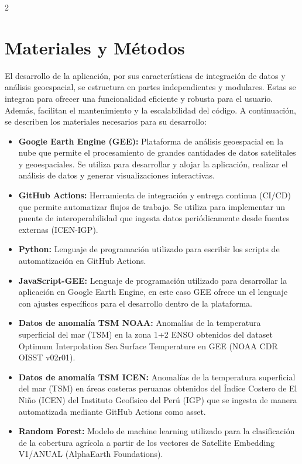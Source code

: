\begin{multicols}{2}
    \section{Materiales y Métodos}

      El desarrollo de la aplicación, por sus características de integración de datos y análisis geoespacial, se estructura en partes independientes y modulares. Estas se integran para ofrecer una funcionalidad eficiente y robusta para el usuario. Además, facilitan el mantenimiento y la escalabilidad del código. A continuación, se describen los materiales necesarios para su desarrollo:

      \begin{itemize}[leftmargin=*]
        \item \textbf{Google Earth Engine (GEE):} Plataforma de análisis geoespacial en la nube que permite el procesamiento de grandes cantidades de datos satelitales y geoespaciales. Se utiliza para desarrollar y alojar la aplicación, realizar el análisis de datos y generar visualizaciones interactivas.
        \item \textbf{GitHub Actions:} Herramienta de integración y entrega continua (CI/CD) que permite automatizar flujos de trabajo. Se utiliza para implementar un puente de interoperabilidad que ingesta datos periódicamente desde fuentes externas (ICEN-IGP).
        \item \textbf{Python:} Lenguaje de programación utilizado para escribir los scripts de automatización en GitHub Actions.
        \item \textbf{JavaScript-GEE:} Lenguaje de programación utilizado para desarrollar la aplicación en Google Earth Engine, en este caso GEE ofrece un el lenguaje con ajustes específicos para el desarrollo dentro de la plataforma.
        \item \textbf{Datos de anomalía TSM NOAA:} Anomalías de la temperatura superficial del mar (TSM) en la zona 1+2 ENSO obtenidos del dataset Optimum Interpolation Sea Surface Temperature en GEE (NOAA CDR OISST v02r01).
        \item \textbf{Datos de anomalía TSM ICEN:} Anomalías de la temperatura superficial del mar (TSM) en áreas costeras peruanas obtenidos del Índice Costero de El Niño (ICEN) del Instituto Geofísico del Perú (IGP) que se ingesta de manera automatizada mediante GitHub Actions como asset.
        \item \textbf{Random Forest:} Modelo de machine learning utilizado para la clasificación de la cobertura agrícola a partir de los vectores de Satellite Embedding V1/ANUAL (AlphaEarth Foundations).

\end{itemize}
\end{multicols}
